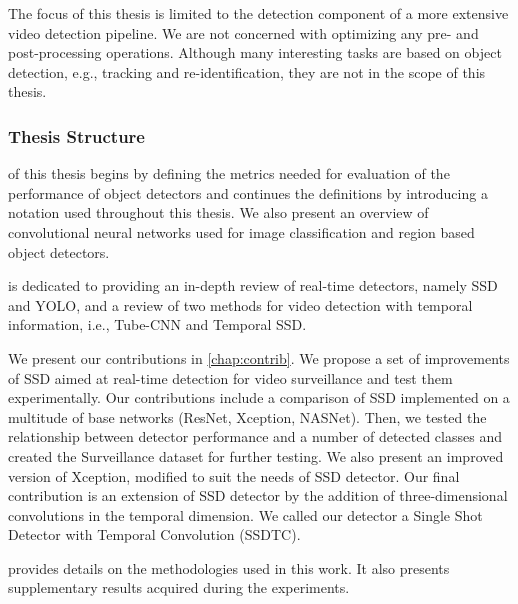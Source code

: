 The focus of this thesis is limited to the detection component of a more extensive video detection pipeline. We are not concerned with optimizing any pre- and post-processing operations. Although many interesting tasks are based on object detection, e.g., tracking and re-identification, they are not in the scope of this thesis.

\subsubsection{Thesis Structure}
 of this thesis begins by defining the metrics needed for evaluation of the performance of object detectors and continues the definitions by introducing a notation used throughout this thesis. We also present an overview of convolutional neural networks used for image classification and region based object detectors. 

 is dedicated to providing an in-depth review of real-time detectors, namely SSD and YOLO, and a review of two methods for video detection with temporal information, i.e., Tube-CNN and Temporal SSD. 

We present our contributions in \cref{chap:contrib}. We propose a set of improvements of SSD aimed at real-time detection for video surveillance and test them experimentally. Our contributions include a comparison of SSD implemented on a multitude of base networks (ResNet, Xception, NASNet). Then, we tested the relationship between detector performance and a number of detected classes and created the Surveillance dataset for further testing. We also present an improved version of Xception, modified to suit the needs of SSD detector. Our final contribution is an extension of SSD detector by the addition of three-dimensional convolutions in the temporal dimension. We called our detector a Single Shot Detector with Temporal Convolution (SSDTC).

 provides details on the methodologies used in this work. It also presents supplementary results acquired during the experiments.